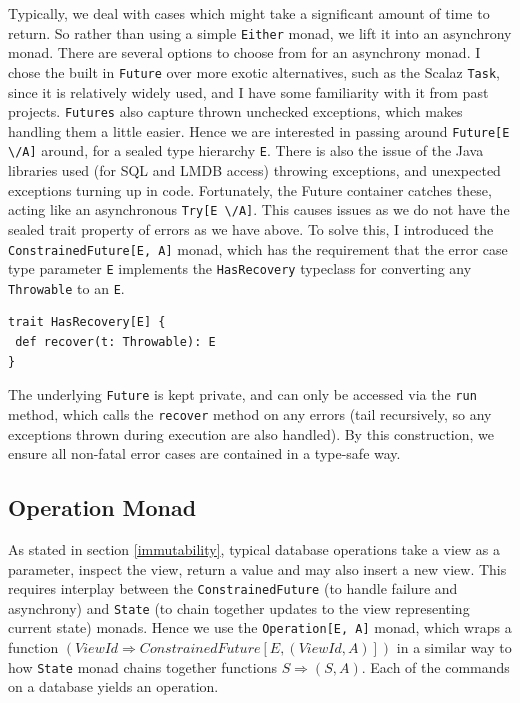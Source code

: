 \documentclass[12pt,a4paper,twoside,openright]{report}
\newcommand\codeName[1]{\texttt{#1}}
\newcommand\either[0]{\textbackslash/}
\renewcommand{\baselinestretch}{1.1}    %
\begin{document}
Typically, we deal with cases which might take a significant amount of time to return. So rather than using a simple \codeName{Either} monad, we lift it into an asynchrony monad. There are several options to choose from for an asynchrony monad. I chose the built in \codeName{Future} over more exotic alternatives, such as the Scalaz \codeName{Task}, since it is relatively widely used, and I have some familiarity with it from past projects. \codeName{Futures} also capture thrown unchecked exceptions, which makes handling them a little easier. Hence we are interested in passing around \codeName{Future[E \either A]} around, for a sealed type hierarchy \codeName{E}. There is also the issue of the Java libraries used (for SQL and LMDB access) throwing exceptions, and unexpected exceptions turning up in code. Fortunately, the  Future container catches these, acting like an asynchronous \codeName{Try[E \either A]}. This causes issues as we do not have the sealed trait property of errors as we have above. To solve this, I introduced the \codeName{ConstrainedFuture[E, A]} monad, which has the requirement that the error case type parameter \codeName{E} implements the \codeName{HasRecovery} typeclass for converting any \codeName{Throwable} to an \codeName{E}.

\renewcommand{\baselinestretch}{0.8}
\begin{framed}
	\begin{verbatim}
trait HasRecovery[E] {
 def recover(t: Throwable): E
}
	\end{verbatim}
\end{framed}
\renewcommand{\baselinestretch}{1.1}

The underlying \codeName{Future} is kept private, and can only be accessed via the \codeName{run} method, which calls the \codeName{recover} method on any errors (tail recursively, so any exceptions thrown during execution are also handled). By this construction, we ensure all non-fatal error cases are contained in a type-safe way.

	\subsection{Operation Monad}
	As stated in section \ref{immutability}, typical database operations take a view as a parameter, inspect the view, return a value and may also insert a new view. This requires interplay between the \codeName{ConstrainedFuture} (to handle failure and asynchrony) and \codeName{State} (to chain together updates to the view representing current state) monads. Hence we use the \codeName{Operation[E, A]} monad, which wraps a function \codeName{$(ViewId \Rightarrow ConstrainedFuture[E, (ViewId, A)])$} in a similar way to how \codeName{State} monad chains together functions \codeName{$S \Rightarrow (S, A)$}. Each of the commands on a database yields an operation.
\end{document}
